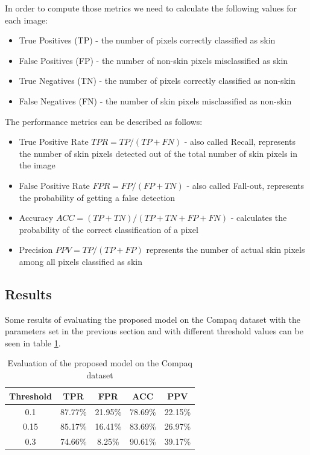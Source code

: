\documentclass[12pt]{report}
\begin{document}
	In order to compute those metrics we need to calculate the following values for each image:
	\begin{itemize}
		\item True Positives (TP) - the number of pixels correctly classified as skin
		\item False Positives (FP) - the number of non-skin pixels misclassified as skin
		\item True Negatives (TN) - the number of pixels correctly classified as non-skin
		\item False Negatives (FN) - the number of skin pixels misclassified as non-skin
	\end{itemize}

	The performance metrics can be described as follows:
	\begin{itemize}
		\item True Positive Rate $TPR = TP / (TP + FN)$ - also called Recall, represents the number of skin pixels detected out of the total number of skin pixels in the image
		\item False Positive Rate $FPR = FP / (FP + TN)$ - also called Fall-out, represents the probability of getting a false detection
		\item Accuracy $ ACC = (TP + TN) / (TP + TN + FP + FN) $ - calculates the probability of the correct classification of a pixel 
		\item Precision $ PPV = TP / (TP + FP) $ represents the number of actual skin pixels among all pixels classified as skin
	\end{itemize}

	\subsection{Results}
	Some results of evaluating the proposed model on the Compaq dataset with the parameters set in the previous section and with different threshold values can be seen in table \ref{tab:results}.
	
	\begin{table}[h!]
		\begin{center}
			\caption{Evaluation of the proposed model on the Compaq dataset}
			\label{tab:results}
			\begin{tabular}{c|c|c|c|c}
				\textbf{Threshold} & \textbf{TPR} & \textbf{FPR} & \textbf{ACC} & \textbf{PPV} \\
				\hline
				
				0.1 & 87.77\% & 21.95\% & 78.69\% & 22.15\% \\
				0.15 & 85.17\% & 16.41\% & 83.69\% & 26.97\% \\
				0.3 & 74.66\% & 8.25\% & 90.61\% & 39.17\% \\
		
			\end{tabular}
		\end{center}
	\end{table}
	
\end{document}
